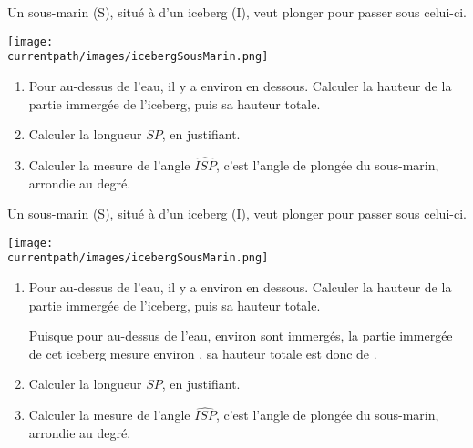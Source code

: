 \begin{exercice*}
    Un sous-marin (S), situé à  d'un iceberg (I), veut plonger pour passer sous celui-ci.
    \begin{center}
        \texttt{[image: \\currentpath/images/icebergSousMarin.png]}
    \end{center}
    \begin{enumerate}
        \item Pour  au-dessus de l'eau, il y a environ  en dessous. Calculer la hauteur de la partie immergée de l'iceberg, puis sa hauteur totale.
        \item Calculer la longueur $SP$, en justifiant.
        \item Calculer la mesure de l'angle $\widehat{ISP}$, c'est l'angle de plongée du sous-marin, arrondie au degré.
    \end{enumerate}
\end{exercice*}
\begin{corrige}
    Un sous-marin (S), situé à  d'un iceberg (I), veut plonger pour passer sous celui-ci.

    \texttt{[image: \\currentpath/images/icebergSousMarin.png]}

    \begin{enumerate}
        \item Pour  au-dessus de l'eau, il y a environ  en dessous. Calculer la hauteur de la partie immergée de l'iceberg, puis sa hauteur totale.

        {\color{red}Puisque pour  au-dessus de l'eau, environ  sont immergés, la partie immergée de cet iceberg mesure environ , sa hauteur totale est donc de .}
        \item Calculer la longueur $SP$, en justifiant.
        
        {\color{red}}
        \item Calculer la mesure de l'angle $\widehat{ISP}$, c'est l'angle de plongée du sous-marin, arrondie au degré.
        
        {\color{red}}
    \end{enumerate}
\end{corrige}

